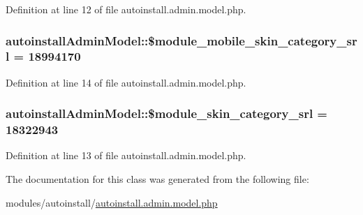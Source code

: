 Definition at line 12 of file autoinstall.\+admin.\+model.\+php.

\hypertarget{classautoinstallAdminModel_add26efaa0308b61db15daa951bef678f}{
\subsubsection[{\$module\+\_\+mobile\+\_\+skin\+\_\+category\+\_\+srl}]{\setlength{\rightskip}{0pt plus 5cm}autoinstall\+Admin\+Model\+::\$module\+\_\+mobile\+\_\+skin\+\_\+category\+\_\+srl = 18994170}}\label{classautoinstallAdminModel_add26efaa0308b61db15daa951bef678f}


Definition at line 14 of file autoinstall.\+admin.\+model.\+php.

\hypertarget{classautoinstallAdminModel_ad9e023f5b4f464ba2cbea5465d05ef69}{
\subsubsection[{\$module\+\_\+skin\+\_\+category\+\_\+srl}]{\setlength{\rightskip}{0pt plus 5cm}autoinstall\+Admin\+Model\+::\$module\+\_\+skin\+\_\+category\+\_\+srl = 18322943}}\label{classautoinstallAdminModel_ad9e023f5b4f464ba2cbea5465d05ef69}


Definition at line 13 of file autoinstall.\+admin.\+model.\+php.



The documentation for this class was generated from the following file\+:\begin{DoxyCompactItemize}
\item 
modules/autoinstall/\hyperlink{autoinstall_8admin_8model_8php}{autoinstall.\+admin.\+model.\+php}\end{DoxyCompactItemize}
